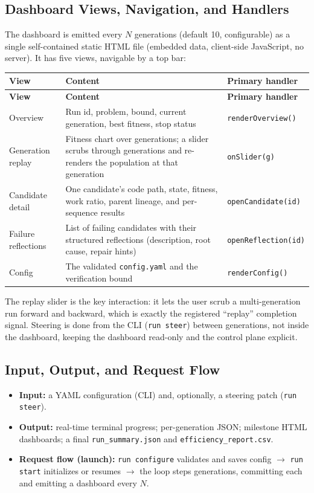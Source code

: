 \documentclass[12pt,a4paper]{article}
\begin{document}
\subsection{Dashboard Views, Navigation, and Handlers}

The dashboard is emitted every $N$ generations (default 10, configurable) as a single self-contained static HTML file (embedded data, client-side JavaScript, no server). It has five views, navigable by a top bar:

\begin{longtable}{|p{3.5cm}|p{6cm}|p{4.5cm}|}
\hline
\textbf{View} & \textbf{Content} & \textbf{Primary handler} \\
\hline
\endfirsthead
\hline
\textbf{View} & \textbf{Content} & \textbf{Primary handler} \\
\hline
\endhead
\hline
\endfoot

Overview & Run id, problem, bound, current generation, best fitness, stop status & \texttt{renderOverview()} \\
\hline
Generation replay & Fitness chart over generations; a slider scrubs through generations and re-renders the population at that generation & \texttt{onSlider(g)} \\
\hline
Candidate detail & One candidate's code path, state, fitness, work ratio, parent lineage, and per-sequence results & \texttt{openCandidate(id)} \\
\hline
Failure reflections & List of failing candidates with their structured reflections (description, root cause, repair hints) & \texttt{openReflection(id)} \\
\hline
Config & The validated \texttt{config.yaml} and the verification bound & \texttt{renderConfig()} \\
\hline
\end{longtable}

The replay slider is the key interaction: it lets the user scrub a multi-generation run forward and backward, which is exactly the registered ``replay'' completion signal. Steering is done from the CLI (\texttt{run steer}) between generations, not inside the dashboard, keeping the dashboard read-only and the control plane explicit.

\subsection{Input, Output, and Request Flow}

\begin{itemize}[noitemsep]
  \item \textbf{Input:} a YAML configuration (CLI) and, optionally, a steering patch (\texttt{run steer}).
  \item \textbf{Output:} real-time terminal progress; per-generation JSON; milestone HTML dashboards; a final \texttt{run\_summary.json} and \texttt{efficiency\_report.csv}.
  \item \textbf{Request flow (launch):} \texttt{run configure} validates and saves config $\to$ \texttt{run start} initializes or resumes $\to$ the loop steps generations, committing each and emitting a dashboard every $N$.
\end{itemize}
\end{document}
